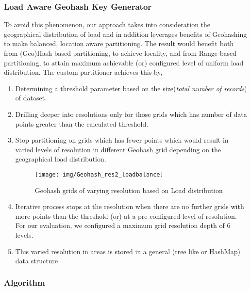 \documentclass[article,type=msc,colorback,12pt,accentcolor=tud1d]{tudthesis}
\begin{document}
			\subsubsection{Load Aware Geohash Key Generator}
				\par To avoid this phenomenon, our approach takes into consideration the geographical distribution of load and in addition leverages benefits of Geohashing to make balanced, location aware partitioning. The result would benefit both from (Geo)Hash based partitioning, to achieve locality, and from Range based partitioning, to attain maximum achievable (or) configured level of uniform load distribution. The custom partitioner achieves this by,
				 \begin{enumerate}
				 	\item Determining a threshold parameter based on the size(\textit{total number of records}) of dataset.
				 	\item Drilling deeper into resolutions only for those grids which has number of data points greater than the calculated threshold.
				 	\item Stop partitioning on grids which has fewer points which would result in varied levels of resolution in different Geohash grid depending on the geographical load distribution.
				 
				 \begin{figure}[h]
				 	\centering
				 	\texttt{[image: img/Geohash\_res2\_loadbalance]}
				 	\caption{Geohash grids of varying resolution based on Load distribution}
				 	\label{fig:Geohash_res2_loadbalance}
				 \end{figure}		
				 
				 	\item Iterative process stops at the resolution when there are no further grids with more points than the threshold (or) at a pre-configured level of resolution. For our evaluation, we configured a maximum grid resolution depth of 6 levels.
				 	\item This varied resolution in areas is stored in a general (tree like or HashMap) data structure
				 \end{enumerate}
									 
							 
			
			\subsubsection{Algorithm}
			
\end{document}

